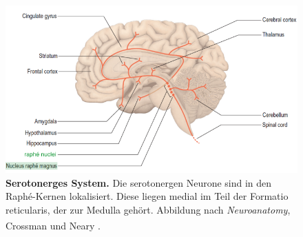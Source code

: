 \documentclass[12pt,a4paper,pdftex]{article}
\begin{document}
\begin{figure}[H]
    \centering
    \includegraphics[width=\textwidth]{pictures/Bilder_monoamine_systeme/serotonerges_system.PNG}
    \caption[Serotonerges System]{\textbf{Serotonerges System.} Die serotonergen Neurone sind in den Raphé-Kernen lokalisiert. Diese liegen medial im Teil der Formatio reticularis, der zur Medulla gehört. Abbildung nach \textit{Neuroanatomy}, Crossman und Neary \textsuperscript{\cite[9]{crossman2014neuroanatomy}}.}
    \label{fig:serotonerges_system}
\end{figure}{}
\end{document}
